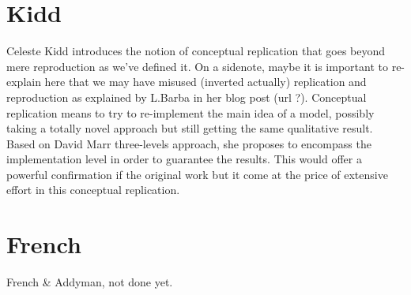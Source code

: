 \documentclass[jou]{apa6}
\begin{document}
\section{Kidd}
Celeste Kidd introduces the notion of conceptual replication that goes beyond
mere reproduction as we've defined it. On a sidenote, maybe it is important to
re-explain here that we may have misused (inverted actually) replication and
reproduction as explained by L.Barba in her blog post (url ?). Conceptual
replication means to try to re-implement the main idea of a model, possibly
taking a totally novel approach but still getting the same qualitative
result. Based on David Marr three-levels approach, she proposes to encompass the implementation level in order to guarantee the results. This would offer a
powerful confirmation if the original work but it come at the price of
extensive effort in this conceptual replication.

\section{French}
French \& Addyman, not done yet.




\hspace*{1cm}
\end{document}
